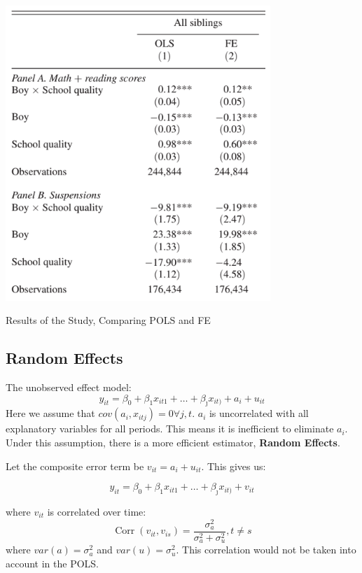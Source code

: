 \documentclass[11pt]{article}
\begin{document}
\begin{table}[h]
    \centering
    \includegraphics[width=10cm]{photos/fe application results.png}
    \caption{Results of the Study, Comparing POLS and FE}
    \label{tab:fe application results}
\end{table}


\subsection{Random Effects}

The unobserved effect model:
\begin{equation}
y_{i t}=\beta_0+\beta_1 x_{i t 1}+\ldots+\beta_{\jmath} x_{i t)}+a_i+u_{i t}
\end{equation}
Here we assume that $cov(a_i,x_{itj}) = 0 \forall j,t$. $a_i$ is uncorrelated with all explanatory variables for all periods. This means it is inefficient to eliminate $a_i$. Under this assumption, there is a more efficient estimator, \textbf{Random Effects}.

Let the composite error term be $v_{it} = a_i + u_{it}$. This gives us:

\[y_{i t}=\beta_0+\beta_1 x_{i t 1}+\ldots+\beta_{\jmath} x_{i t)}+v_{it}\]

where $v_{it}$ is correlated over time:
\begin{equation}
\operatorname{Corr}\left(v_{i t}, v_{i s}\right)=\frac{\sigma_a^2}{\sigma_a^2+\sigma_u^2}, t \neq s
\end{equation}
where $var(a) = \sigma_a^2$ and $var(u) = \sigma_u^2$. This correlation would not be taken into account in the POLS.
\end{document}
